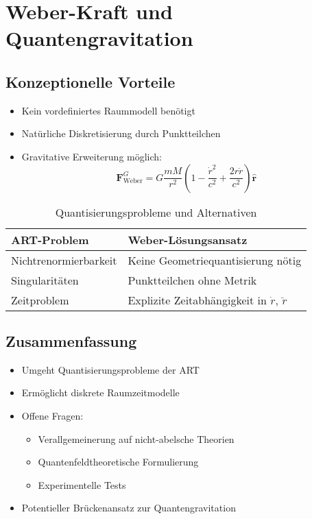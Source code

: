 \section{Weber-Kraft und Quantengravitation}

\subsection{Konzeptionelle Vorteile}
\begin{itemize}[leftmargin=*,noitemsep]
    \item Kein vordefiniertes Raummodell benötigt
    \item Natürliche Diskretisierung durch Punktteilchen
    \item Gravitative Erweiterung möglich:
    \[ \bm{F}_{\text{Weber}}^{G} = G\frac{mM}{r^2}\left(1 - \frac{\dot{r}^2}{c^2} + \frac{2r\ddot{r}}{c^2}\right)\bm{\hat{r}} \]
\end{itemize}

\begin{table}[h]
\centering
\caption{Quantisierungsprobleme und Alternativen}
\begin{tabularx}{\linewidth}{lX}
\toprule
\textbf{ART-Problem} & \textbf{Weber-Lösungsansatz} \\
\midrule
Nichtrenormierbarkeit & Keine Geometriequantisierung nötig \\
Singularitäten & Punktteilchen ohne Metrik \\
Zeitproblem & Explizite Zeitabhängigkeit in $\dot{r}$, $\ddot{r}$ \\
\bottomrule
\end{tabularx}
\end{table}

\subsection*{Zusammenfassung}
\begin{itemize}[leftmargin=*,noitemsep]
    \item Umgeht Quantisierungsprobleme der ART
    \item Ermöglicht diskrete Raumzeitmodelle
    \item Offene Fragen:
    \begin{itemize}[noitemsep]
        \item Verallgemeinerung auf nicht-abelsche Theorien
        \item Quantenfeldtheoretische Formulierung
        \item Experimentelle Tests
    \end{itemize}
    \item Potentieller Brückenansatz zur Quantengravitation
\end{itemize}

